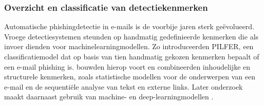 \subsubsection{Overzicht en classificatie van detectiekenmerken}
\label{subsubsec:Overzicht en classificatie van detectiekenmerken}
Automatische phishingdetectie in e-mails is de voorbije jaren sterk geëvolueerd. Vroege detectiesystemen steunden op handmatig gedefinieerde kenmerken die als invoer dienden voor machinelearningmodellen. Zo introduceerden \textcite{Fette2007} PILFER, een classificatiemodel dat op basis van tien handmatig gekozen kenmerken bepaalt  of een e-mail phishing is. \textcite{Bergholz2010} bouwden hierop voort en combineerden  inhoudelijke en structurele kenmerken, zoals statistische modellen voor de onderwerpen van een e-mail en de sequentiële analyse van tekst en externe links. Later onderzoek maakt  daarnaast gebruik van machine- en deep-learningmodellen \autocite{Salloum2022}.